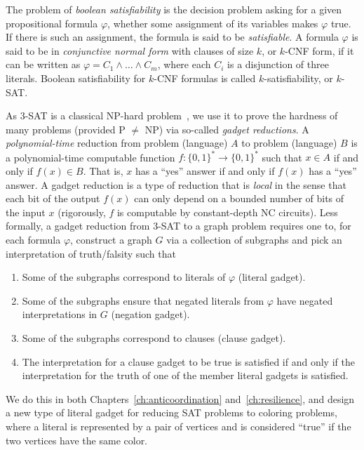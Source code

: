 The problem of \emph{boolean satisfiability} is the decision problem asking for
a given propositional formula $\varphi$, whether some assignment of its
variables makes $\varphi$ true. If there is such an assignment, the formula is
said to be \emph{satisfiable}. A formula $\varphi$ is said to be in
\emph{conjunctive normal form} with clauses of size $k$, or $k$-CNF form, if it
can be written as $\varphi = C_1 \wedge \dots \wedge C_m$, where each $C_i$ is
a disjunction of three literals. Boolean satisfiability for $k$-CNF formulas is
called $k$-satisfiability, or $k$-SAT. 

As 3-SAT is a classical NP-hard problem~\cite{GareyJ79}, we use it to prove the
hardness of many problems (provided P $\neq$ NP) via so-called \emph{gadget
reductions}. A \emph{polynomial-time} reduction from problem (language) $A$ to
problem (language) $B$ is a polynomial-time computable function $f : \{0,1\}^*
\to \{0,1\}^*$ such that $x \in A$ if and only if $f(x) \in B$. That is, $x$
has a ``yes'' answer if and only if $f(x)$ has a ``yes'' answer. A gadget
reduction is a type of reduction that is \emph{local} in the sense that each
bit of the output $f(x)$ can only depend on a bounded number of bits of the
input $x$ (rigorously, $f$ is computable by constant-depth NC circuits). Less
formally, a gadget reduction from 3-SAT to a graph problem requires one to, for
each formula $\varphi$, construct a graph $G$ via a collection of subgraphs
and pick an interpretation of truth/falsity such that 

\begin{enumerate}
\item Some of the subgraphs correspond to literals of $\varphi$ (literal
gadget).
\item Some of the subgraphs ensure that negated literals from $\varphi$ have
negated interpretations in $G$ (negation gadget).
\item Some of the subgraphs correspond to clauses (clause gadget).
\item The interpretation for a clause gadget to be true is satisfied if and
only if the interpretation for the truth of one of the member literal gadgets
is satisfied.
\end{enumerate}

We do this in both Chapters~\ref{ch:anticoordination} and~\ref{ch:resilience},
and design a new type of literal gadget for reducing SAT problems to coloring
problems, where a literal is represented by a pair of vertices and is
considered ``true'' if the two vertices have the same color.

